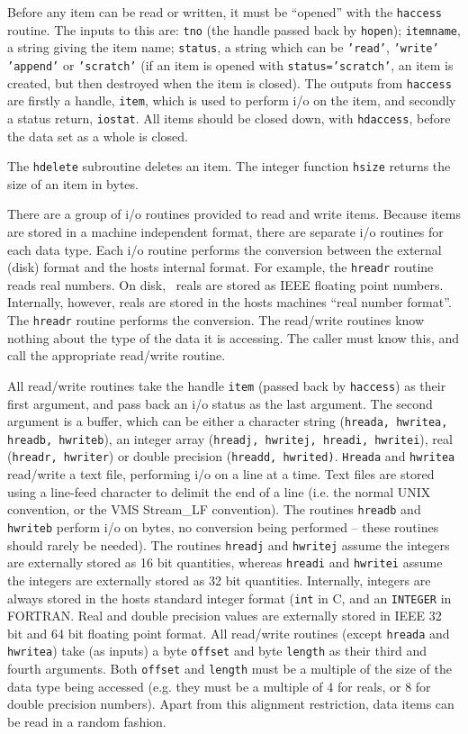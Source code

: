 \documentclass{report}
\begin{document}
Before any item can be read or written, it must be ``opened'' with the
{\tt haccess} routine. The inputs to this are: {\tt tno} (the handle passed
back by {\tt hopen}); {\tt itemname}, a string giving the item name;
{\tt status}, a string which can be {\tt 'read'}, {\tt 'write'} {\tt 'append'}
or {\tt 'scratch'} (if an item is opened with {\tt status='scratch'}, an item
is created, but then destroyed when the item is closed). The outputs from
{\tt haccess} are firstly a handle, {\tt item}, which is used to perform i/o on
the item, and secondly a status return, {\tt iostat}. All items should be
closed down, with {\tt hdaccess}, before the data set as a whole is closed.

The {\tt hdelete} subroutine deletes an item.
The integer function {\tt hsize} returns the size of an item in bytes.

There are a group of i/o routines provided to read and write items. Because
items are stored in a machine independent format, there are separate i/o
routines for each data type.  Each i/o routine performs the conversion between
the external (disk) format and the hosts internal format. For example, the
{\tt hreadr} routine reads real numbers. On disk, \miriad\ reals are stored
as IEEE floating point numbers. Internally, however, reals are stored in the
hosts machines ``real number format''. The {\tt hreadr} routine performs the
conversion. The read/write
routines know nothing about the type of the data it is accessing. The
caller must know this, and call the appropriate read/write routine.

All read/write routines take the handle {\tt item} (passed back by
{\tt haccess}) as their first argument, and pass back an i/o status as the last
argument. The second argument is a buffer, which can be either a character
string ({\tt hreada, hwritea, hreadb, hwriteb}), an integer array ({\tt hreadj,
hwritej, hreadi, hwritei}), real ({\tt hreadr, hwriter}) or double precision
({\tt hreadd, hwrited)}. {\tt Hreada} and {\tt hwritea} read/write a text file,
performing i/o on a line at a time. Text files are stored using a line-feed
character to delimit the end of a line (i.e. the normal UNIX convention, or the
VMS Stream\_LF convention). The routines {\tt hreadb} and {\tt hwriteb} perform
i/o on bytes, no conversion being performed -- these routines should rarely be
needed). The routines {\tt hreadj} and {\tt hwritej} assume the integers are
externally stored as 16 bit quantities, whereas {\tt hreadi} and {\tt hwritei}
assume the integers are externally stored as 32 bit quantities. Internally,
integers are always stored in the hosts standard integer format ({\tt int}
in C, and an {\tt INTEGER} in FORTRAN. Real and double
precision values are externally stored in IEEE 32 bit and 64 bit floating point
format. All read/write routines (except {\tt hreada} and {\tt hwritea}) take
(as inputs) a byte {\tt offset} and byte {\tt length} as their third and fourth
arguments. Both {\tt offset} and {\tt length} must be a multiple of the size
of the data type being accessed (e.g. they must be a multiple of 4 for
reals, or 8 for double precision numbers). Apart from this alignment
restriction, data items can be read in a random fashion.
\end{document}
